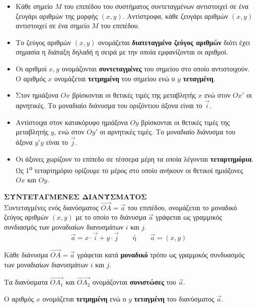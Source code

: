 \documentclass[twoside,10pt]{book}
\def\xrwma{red!80!black}
\newcounter{orismos}[section]
\renewcommand{\theorismos}{\arabic{orismos}}
\newcommand{\Orismos}[1]{\refstepcounter{orismos}{\textbf{\textbf{\textcolor{\xrwma}{{\large Ορισμός\hspace{2mm}\theorismos\;}:\;}}}}\hspace{1mm} \MakeUppercase{\textbf{#1}\\}}{}
\begin{document}
\begin{itemize}
\item Κάθε σημείο $ M $ του επιπέδου του συστήματος συντεταγμένων αντιστοιχεί σε ένα ζευγάρι αριθμών της μορφής $(x,y)$. Aντίστροφα, κάθε ζευγάρι αριθμών $(x,y)$ αντιστοιχεί σε ένα σημείο $ M $ του επιπέδου.
\item Το ζεύγος αριθμών $(x,y)$ ονομάζεται \textbf{διατεταγμένο ζεύγος αριθμών} διότι έχει σημασία η διάταξη δηλαδή η σειρά με την οποία εμφανίζονται οι αριθμοί.
\item Οι αριθμοί $x,y$ ονομάζονται \textbf{συντεταγμένες} του σημείου στο οποίο αντιστοιχούν. Ο αριθμός $x$ ονομάζεται \textbf{τετμημένη} του σημείου ενώ ο $y$ \textbf{τεταγμένη}.
\item Στον ημιάξονα $ Ox $ βρίσκονται οι θετικές τιμές της μεταβλητής $x$ ενώ στον $ Ox' $ οι αρνητικές. Το μοναδιαίο διάνυσμα του οριζόντιου άξονα είναι το $ \vec{i} $.
\item Αντίστοιχα στον κατακόρυφο ημιάξονα $ Oy $ βρίσκονται οι θετικές τιμές της μεταβλητής $y$, ενώ στον $ Oy' $ οι αρνητικές τιμές. Το μοναδιαίο διάνυσμα του άξονα $ y'y $ είναι το $ \vec{j} $.
\item Οι άξονες χωρίζουν το επίπεδο σε τέσσερα μέρη τα οποία λέγονται \textbf{τεταρτημόρια}. Ως 1\textsuperscript{ο} τεταρτημόριο ορίζουμε το μέρος στο οποίο ανήκουν οι θετικοί ημιάξονες $ Ox $ και $ Oy $.
\end{itemize}
\Orismos{Συντεταγμένες διανύσματος}
Συντεταγμένες ενός διανύσματος $ \overrightarrow{OA}=\vec{a} $ του επιπέδου, ονομάζεται το μοναδικό ζεύγος αριθμών $ (x,y) $ με το οποίο το διάνυσμα $ \vec{a} $ γράφεται ως γραμμικός συνδιασμός των μοναδιαίων διανυσμάτων $ i $ και $ j $.
\[ \vec{a}=x\cdot\vec{i}+y\cdot\vec{j}\qquad\textrm{ή}\qquad\vec{a}=(x,y) \]
{\begin{rlist}
\item Κάθε διάνυσμα $ \overrightarrow{OA}=\vec{a} $ γράφεται κατά \textbf{μοναδικό} τρόπο ως γραμμικός συνδυασμός των μοναδιαίων διανυσμάτων $ i $ και $ j $.
\item Τα διανύσματα $ \overrightarrow{OA_1} $ και $ \overrightarrow{OA_2} $ ονομάζονται \textbf{συνιστώσες} του $ \vec{a} $.
\item Ο αριθμός $x$ ονομάζεται \textbf{τετμημένη} ενώ ο $y$ \textbf{τεταγμένη} του διανύσματος $ \vec{a} $.
\end{rlist}}\\\\
\end{document}
